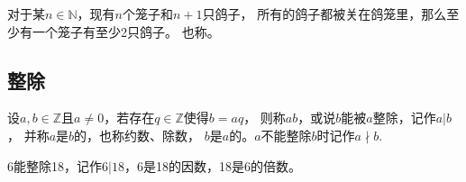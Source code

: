 

\begin{theorem}\label{theorem:7.ex02.2}
    对于某$n\in\mathbb{N}$，现有$n$个笼子和$n+1$只鸽子，
    所有的鸽子都被关在鸽笼里，那么至少有一个笼子有至少2只鸽子。
    也称。
\end{theorem}

\subsection*{整除}
\begin{definition}
    设$a,b\in\mathbb{Z}$且$a\neq0$，若存在$q\in\mathbb{Z}$使得$b=aq$，
    则称$a$$b$，或说$b$能被$a$整除，记作$a|b$，
    并称$a$是$b$的，也称{\sffamily 约数}、{\sffamily 除数}，
    $b$是$a$的。$a$不能整除$b$时记作$a\nmid b$.
\end{definition}

\begin{example}
    6能整除18，记作$6|18$，6是18的因数，18是6的倍数。
\end{example}

